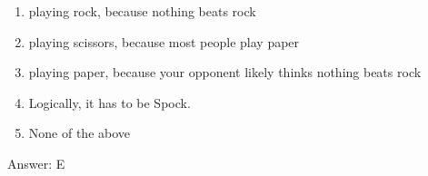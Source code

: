 \documentclass[11pt,]{article}
\providecommand{\tightlist}{%
  \setlength{\itemsep}{0pt}\setlength{\parskip}{0pt}}
\begin{document}
\begin{enumerate}
\def\labelenumi{\Alph{enumi})}
\tightlist
\item
  playing rock, because nothing beats rock
\item
  playing scissors, because most people play paper
\item
  playing paper, because your opponent likely thinks nothing beats rock
\item
  Logically, it has to be Spock.
\item
  None of the above
\end{enumerate}

Answer: E
\end{document}
